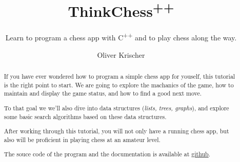 \documentclass{scrreprt}
\numberwithin{equation}{chapter}
\begin{document}
\title{ThinkChess\textsuperscript{++}}
\author{Oliver Krischer}
\subtitle{Learn to program a chess app with C\textsuperscript{++} and to play chess along the way.}
\maketitle
\begin{abstract}
  If you have ever wondered how to program a simple chess app for youself,
  this tutorial is the right point to start.
  We are going to explore the machanics of the game, how to maintain and display the game status,
  and how to find a good next move.

  To that goal we we'll also dive into data structures (\emph{lists, trees, graphs}),
  and explore some basic search algorithms based on these data structures.

  After working through this tutorial, you will not only have a running chess app,
  but also will be proficient in playing chess at an amateur level. 

  The souce code of the program and the documentation is available at
  \href{https://github.com/okrischer/ThinkChess}{github}.
\end{abstract}
\tableofcontents


\end{document}
